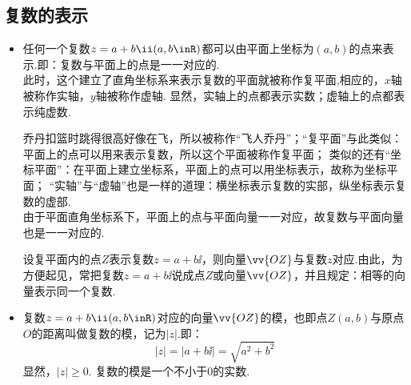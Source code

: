   \subsection{复数的表示}
    \begin{itemize}
      \item %
        任何一个复数$z=a+b\ii(a,b\inR)$都可以由平面上坐标为$(a,b)$的点来表示.即：{\FCom 复数与平面上的点是一一对应的}.\\
        此时，这个建立了直角坐标系来表示复数的平面就被称作{\fsong 复平面},相应的，$x$轴被称作{\fsong 实轴}，$y$轴被称作{\fsong 虚轴}.
        显然，{\FCom 实轴上的点都表示实数；虚轴上的点都表示纯虚数}.\par
        {\FCom \hspace{2em}乔丹扣篮时跳得很高好像在飞，所以被称作“飞人乔丹”；“复平面”与此类似：平面上的点可以用来表示复数，所以这个平面被称作复平面；
         类似的还有“坐标平面”：在平面上建立坐标系，平面上的点可以用坐标表示，故称为坐标平面；
         “实轴”与“虚轴”也是一样的道理：横坐标表示复数的实部，纵坐标表示复数的虚部.}\\
        由于平面直角坐标系下，平面上的点与平面向量一一对应，故复数与平面向量也是一一对应的.\\
        \begin{center}\vspace{-2em}\vspace{-1.5em}
        \end{center}
        设复平面内的点$Z$表示复数$z=a+b\ii$，则向量$\vv{OZ}$与复数$z$对应.由此，为方便起见，常把复数$z=a+b\ii$说成点$Z$或向量$\vv{OZ}$，并且规定：相等的向量表示同一个复数.
        \\ 
      \item 复数$z=a+b\ii(a,b\inR)$对应的向量$\vv{OZ}$的模，也即点$Z(a,b)$与原点$O$的距离叫做复数的模，记为$|z|$.即：
        \[|z|=|a+b\ii|=\sqrt{a^2+b^2}\]
        显然，$|z|\geqslant0$.
        {\FCom 复数的模是一个不小于0的实数.}
        \\
    \end{itemize}

